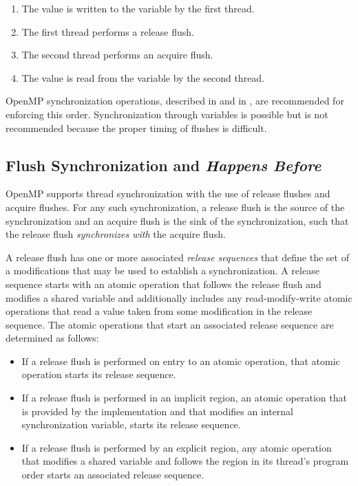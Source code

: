 \begin{enumerate}
    \item The value is written to the variable by the first thread.
    \item The first thread performs a release flush.
    \item The second thread performs an acquire flush.
    \item The value is read from the variable by the second thread.
\end{enumerate}

\begin{note}
OpenMP synchronization operations, described in 
 and in 
, are recommended for enforcing this 
order. Synchronization through variables is possible but is not 
recommended because the proper timing of flushes is difficult.
\end{note}


\subsection{Flush Synchronization and \emph{Happens Before}}
\label{subsec:happens-before}

OpenMP supports thread synchronization with the use of release flushes and
acquire flushes. For any such synchronization, a release flush is the source
of the synchronization and an acquire flush is the sink of the
synchronization, such that the release flush \emph{synchronizes with} the
acquire flush.

A release flush has one or more associated \emph{release sequences} that
define the set of a modifications that may be used to establish a
synchronization. A release sequence starts with an atomic operation
that follows the release flush and modifies a shared variable and additionally
includes any read-modify-write atomic operations that read a value taken from
some modification in the release sequence. The atomic operations that start an
associated release sequence are determined as follows:

\begin{itemize}
\item If a release flush is performed on entry to an atomic operation, that
    atomic operation starts its release sequence.
\item If a release flush is performed in an implicit  region, an 
    atomic operation that is provided by the implementation and that modifies
    an internal synchronization variable, starts its release sequence.
\item If a release flush is performed by an explicit  region, any
    atomic operation that modifies a shared variable and follows the
     region in its thread's program order starts an associated
    release sequence.
\end{itemize}

